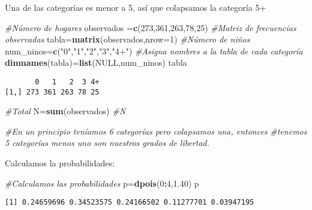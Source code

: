 \documentclass[a4paper,oneside,openany]{book}
\newenvironment{Shaded}{\begin{snugshade}}{\end{snugshade}}
\newcommand{\KeywordTok}[1]{\textcolor[rgb]{0.13,0.29,0.53}{\textbf{#1}}}
\newcommand{\DataTypeTok}[1]{\textcolor[rgb]{0.13,0.29,0.53}{#1}}
\newcommand{\DecValTok}[1]{\textcolor[rgb]{0.00,0.00,0.81}{#1}}
\newcommand{\FloatTok}[1]{\textcolor[rgb]{0.00,0.00,0.81}{#1}}
\newcommand{\StringTok}[1]{\textcolor[rgb]{0.31,0.60,0.02}{#1}}
\newcommand{\CommentTok}[1]{\textcolor[rgb]{0.56,0.35,0.01}{\textit{#1}}}
\newcommand{\OtherTok}[1]{\textcolor[rgb]{0.56,0.35,0.01}{#1}}
\newcommand{\OperatorTok}[1]{\textcolor[rgb]{0.81,0.36,0.00}{\textbf{#1}}}
\newcommand{\NormalTok}[1]{#1}
\begin{document}
Una de las categorías es menor a 5, así que colapsamos la categoría 5+

\begin{Shaded}
\begin{Highlighting}[]
\CommentTok{#Número de hogares}
\NormalTok{observados =}\KeywordTok{c}\NormalTok{(}\DecValTok{273}\NormalTok{,}\DecValTok{361}\NormalTok{,}\DecValTok{263}\NormalTok{,}\DecValTok{78}\NormalTok{,}\DecValTok{25}\NormalTok{)}
\CommentTok{#Matriz de frecuencias observadas}
\NormalTok{tabla=}\KeywordTok{matrix}\NormalTok{(observados,}\DataTypeTok{nrow=}\DecValTok{1}\NormalTok{)}
\CommentTok{#Número de niños}
\NormalTok{num_ninos=}\KeywordTok{c}\NormalTok{(}\StringTok{"0"}\NormalTok{,}\StringTok{"1"}\NormalTok{,}\StringTok{"2"}\NormalTok{,}\StringTok{"3"}\NormalTok{,}\StringTok{"4+"}\NormalTok{)}
\CommentTok{#Asigna nombres a la tabla de cada categoría}
\KeywordTok{dimnames}\NormalTok{(tabla)=}\KeywordTok{list}\NormalTok{(}\OtherTok{NULL}\NormalTok{,num_ninos)}
\NormalTok{tabla}
\end{Highlighting}
\end{Shaded}

\begin{verbatim}
       0   1   2  3 4+
[1,] 273 361 263 78 25
\end{verbatim}

\begin{Shaded}
\begin{Highlighting}[]
\CommentTok{#Total}
\NormalTok{N=}\KeywordTok{sum}\NormalTok{(observados)}
\CommentTok{#N}


\CommentTok{#En un principio teníamos 6 categorías pero colapsamos una, entonces }
\CommentTok{#tenemos 5 categorías menos uno son nuestros grados de libertad.}
\end{Highlighting}
\end{Shaded}

Calculamos la probabilidades:

\begin{Shaded}
\begin{Highlighting}[]
\CommentTok{#Calculamos las probabilidades}
\NormalTok{p=}\KeywordTok{dpois}\NormalTok{(}\DecValTok{0}\OperatorTok{:}\DecValTok{4}\NormalTok{,}\FloatTok{1.40}\NormalTok{)}
\NormalTok{p}
\end{Highlighting}
\end{Shaded}

\begin{verbatim}
[1] 0.24659696 0.34523575 0.24166502 0.11277701 0.03947195
\end{verbatim}
\end{document}

